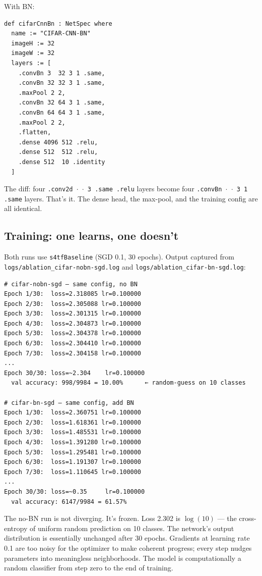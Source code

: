 With BN:

\begin{verbatim}
def cifarCnnBn : NetSpec where
  name := "CIFAR-CNN-BN"
  imageH := 32
  imageW := 32
  layers := [
    .convBn 3  32 3 1 .same,
    .convBn 32 32 3 1 .same,
    .maxPool 2 2,
    .convBn 32 64 3 1 .same,
    .convBn 64 64 3 1 .same,
    .maxPool 2 2,
    .flatten,
    .dense 4096 512 .relu,
    .dense 512  512 .relu,
    .dense 512  10 .identity
  ]
\end{verbatim}

The diff: four \texttt{.conv2d $\cdot$ $\cdot$ 3 .same .relu} layers
become four \texttt{.convBn $\cdot$ $\cdot$ 3 1 .same} layers. That's
it. The dense head, the max-pool, and the training config are all
identical.

\subsection*{Training: one learns, one doesn't}

Both runs use \texttt{s4tfBaseline} (SGD 0.1, 30 epochs). Output
captured from \texttt{logs/ablation\_cifar-nobn-sgd.log} and
\texttt{logs/ablation\_cifar-bn-sgd.log}:

\begin{verbatim}
# cifar-nobn-sgd — same config, no BN
Epoch 1/30:  loss=2.318085 lr=0.100000
Epoch 2/30:  loss=2.305088 lr=0.100000
Epoch 3/30:  loss=2.301315 lr=0.100000
Epoch 4/30:  loss=2.304873 lr=0.100000
Epoch 5/30:  loss=2.304378 lr=0.100000
Epoch 6/30:  loss=2.304410 lr=0.100000
Epoch 7/30:  loss=2.304158 lr=0.100000
...
Epoch 30/30: loss=~2.304    lr=0.100000
  val accuracy: 998/9984 = 10.00%      ← random-guess on 10 classes

# cifar-bn-sgd — same config, add BN
Epoch 1/30:  loss=2.360751 lr=0.100000
Epoch 2/30:  loss=1.618361 lr=0.100000
Epoch 3/30:  loss=1.485531 lr=0.100000
Epoch 4/30:  loss=1.391280 lr=0.100000
Epoch 5/30:  loss=1.295481 lr=0.100000
Epoch 6/30:  loss=1.191307 lr=0.100000
Epoch 7/30:  loss=1.110645 lr=0.100000
...
Epoch 30/30: loss=~0.35     lr=0.100000
  val accuracy: 6147/9984 = 61.57%
\end{verbatim}

The no-BN run is not diverging. It's frozen. Loss 2.302 is
$\log(10)$ --- the cross-entropy of uniform random prediction on 10
classes. The network's output distribution is essentially unchanged
after 30 epochs. Gradients at learning rate 0.1 are too noisy for
the optimizer to make coherent progress; every step nudges
parameters into meaningless neighborhoods. The model is
computationally a random classifier from step zero to the end of
training.

